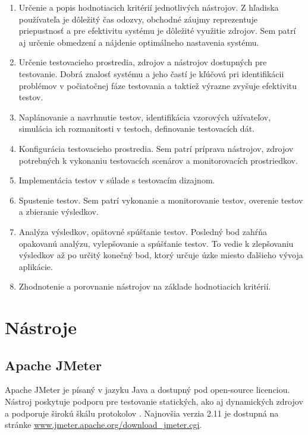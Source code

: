\documentclass[12pt,oneside,final]{fithesis-utf8}
\begin{document}
\begin{enumerate}

\item Určenie a popis hodnotiacich kritérií jednotlivých nástrojov. Z hľadiska používateľa je dôležitý čas odozvy, obchodné záujmy reprezentuje priepustnosť a pre efektivitu systému je dôležité využitie zdrojov. Sem patrí aj určenie obmedzení a nájdenie optimálneho nastavenia systému.

\item Určenie testovacieho prostredia, zdrojov a nástrojov dostupných pre testovanie. Dobrá znalosť systému a jeho častí je kľúčová pri identifikácii problémov v počiatočnej fáze testovania a taktiež výrazne zvyšuje efektivitu testov.

\item Naplánovanie a navrhnutie testov, identifikácia vzorových užívateľov, simulácia ich rozmanitosti v testoch, definovanie testovacích dát.

\item Konfigurácia testovacieho prostredia. Sem patrí príprava nástrojov, zdrojov potrebných k vykonaniu testovacích scenárov a monitorovacích prostriedkov.

\item Implementácia testov v súlade s testovacím dizajnom.

\item Spustenie testov. Sem patrí vykonanie a monitorovanie testov, overenie testov a zbieranie výsledkov.

\item Analýza výsledkov, opätovné spúšťanie testov. Posledný bod zahŕňa opakovanú analýzu, vylepšovanie a spúšťanie testov. To vedie k zlepšovaniu výsledkov až po určitý konečný bod, ktorý určuje úzke miesto ďalšieho vývoja aplikácie.

\item Zhodnotenie a porovnanie nástrojov na základe hodnotiacich kritérií.

\end{enumerate}

\chapter{Nástroje}

\section{Apache JMeter}
Apache JMeter je písaný v jazyku Java a dostupný pod open-source licenciou. Nástroj poskytuje podporu pre testovanie statických, ako aj dynamických zdrojov a podporuje širokú škálu protokolov \cite{Apache}. Najnovšia verzia 2.11 je dostupná na stránke \url{www.jmeter.apache.org/download_jmeter.cgi}.
\end{document}
